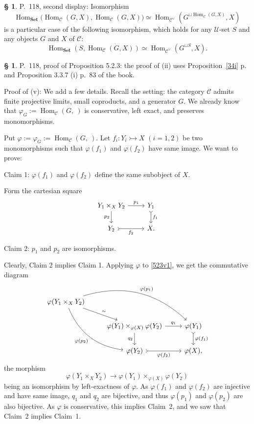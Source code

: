 \documentclass[12pt]{article}
\theoremstyle{remark}
\theoremstyle{definition}
\newtheorem{s}[thm]{\S}
\newcommand{\C}{\mathcal C}
\newcommand{\U}{\mathcal U}
\newcommand{\Set}{\mathbf{Set}}
\newcommand{\pp}{\varphi}
\newcommand{\mono}{\rightarrowtail}
\DeclareMathOperator{\Hom}{Hom}
\begin{document}
%

\begin{s}
P.~118, second display: Isomorphism 
$$
\Hom_{\Set}\Big(\Hom_\C(G,X),\Hom_\C(G,X)\Big)\simeq\Hom_{\C^\vee}(G^{\sqcup\Hom_\C(G,X)},X)
$$ 
is a particular case of the following isomorphism, which holds for any $\U$-set $S$ and any objects $G$ and $X$ of $\C$: 
$$
\Hom_{\Set}(S,\Hom_\C(G,X))\simeq\Hom_{\C^\vee}(G^{\sqcup S},X).
$$ 
\end{s}

%

\begin{s}
P.~118, proof of Proposition 5.2.3: the proof of (ii) uses Proposition~\ref{34i} p.~\pageref{34i} and Proposition 3.3.7 (i) p.~83 of the book. 

Proof of (v): We add a few details. Recall the setting: the category $\C$ admits finite projective limits, small coproducts, and a generator $G$. We already know that $\pp_G:=\Hom_\C(G,\ )$ is conservative, left exact, and preserves monomorphisms. 

Put $\pp:=\pp_G:=\Hom_\C(G,\ )$. Let $f_i:Y_i\mono X$ $(i=1,2)$ be two monomorphisms such that $\pp(f_1)$ and $\pp(f_2)$ have same image. We want to prove:

Claim 1: $\pp(f_1)$ and $\pp(f_2)$ define the same subobject of $X$.

Form the cartesian square
%
\begin{equation}\label{523v1}
\begin{tikzcd}
Y_1\times_XY_2\ar{r}{p_1}\ar{d}[swap]{p_2}&Y_1\ar[tail]{d}{f_1}\\ 
Y_2\ar[tail]{r}[swap]{f_2}&X.
\end{tikzcd}
\end{equation}

Claim 2: $p_1$ and $p_2$ are isomorphisms. 

Clearly, Claim 2 implies Claim 1. Applying $\pp$ to \eqref{523v1}, we get the commutative diagram 
$$
\begin{tikzcd}
\pp(Y_1\times_XY_2)\ar{rd}{\sim}\ar[bend left]{rrd}{\pp(p_1)}\ar[bend right]{rdd}[swap]{\pp(p_2)}\\ 
{}&\pp(Y_1)\times_{\pp(X)}\pp(Y_2)\ar{r}{q_1}\ar{d}[swap]{q_2}&\pp(Y_1)\ar[tail]{d}{\pp(f_1)}\\ 
{}&\pp(Y_2)\ar[tail]{r}[swap]{\pp(f_2)}&\pp(X),
\end{tikzcd}
$$ 
the morphism 
$$
\pp(Y_1\times_XY_2)\to\pp(Y_1)\times_{\pp(X)}\pp(Y_2)
$$ 
being an isomorphism by left-exactness of $\pp$. As $\pp(f_1)$ and $\pp(f_2)$ are injective and have same image, $q_1$ and $q_2$ are bijective, and thus $\pp(p_1)$ and $\pp(p_2)$ are also bijective. As $\pp$ is conservative,  this implies Claim~2, and we saw that Claim~2 implies Claim~1.
\end{s}
\end{document}
